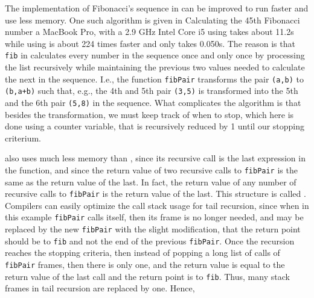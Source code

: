 \documentclass[fsharpNotes.tex]{subfiles}
\begin{document}
The implementation of Fibonacci's sequence in  can be improved to run faster and use less memory. One such algorithm is given in 
%
%
Calculating the 45th Fibonacci number a MacBook Pro, with a 2.9 GHz Intel Core i5 using  takes about 11.2s while using  is about 224 times faster and only takes 0.050s. The reason is that \lstinline{fib} in  calculates every number in the sequence once and only once by processing the list recursively while maintaining the previous two values needed to calculate the next in the sequence. I.e., the function \lstinline{fibPair} transforms the pair \lstinline{(a,b)} to \lstinline{(b,a+b)} such that, e.g., the 4th and 5th pair \lstinline{(3,5)} is transformed into the 5th and the 6th pair \lstinline{(5,8)} in the sequence. What complicates the algorithm is that besides the transformation, we must keep track of when to stop, which here is done using a counter variable, that is recursively reduced by 1 until our stopping criterium.

 also uses much less memory than , since its recursive call is the last expression in the function, and since the return value of two recursive calls to \lstinline{fibPair} is the same as the return value of the last. In fact, the return value of any number of recursive calls to \lstinline{fibPair} is the return value of the last. This structure is called . Compilers can easily optimize the call stack usage for tail recursion, since when in this example \lstinline{fibPair} calls itself, then its frame is no longer needed, and may be replaced by the new \lstinline{fibPair} with the slight modification, that the return point should be to \lstinline{fib} and not the end of the previous \lstinline{fibPair}. Once the recursion reaches the stopping criteria, then instead of popping a long list of calls of \lstinline{fibPair} frames, then there is only one, and the return value is equal to the return value of the last call and the return point is to \lstinline{fib}. Thus, many stack frames in tail recursion are replaced by one. Hence, 
\end{document}
